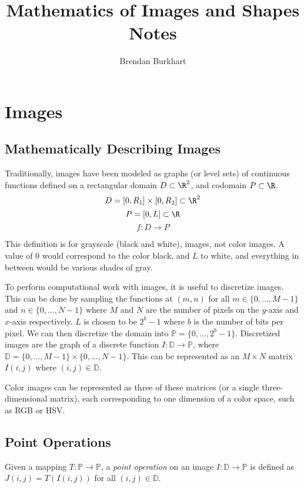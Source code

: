 \documentclass[12pt]{article}
\begin{document}
\title{Mathematics of Images and Shapes Notes}
\author{Brendan Burkhart}
\maketitle

\tableofcontents
\newpage

\section{Images}

\subsection{Mathematically Describing Images}

Traditionally, images have been modeled as graphs (or level sets) of continuous functions defined on a rectangular domain $D \subset \R^2$, and codomain $P \subset \R$. \[D = \left[0, R_1\right] \times \left[0, R_2\right] \subset \R^2\] \[P = \left[0, L\right] \subset \R\] \[f : D \to P\]

This definition is for grayscale (black and white), images, not color images. A value of $0$ would correspond to the color black, and $L$ to white, and everything in between would be various shades of gray.

To perform computational work with images, it is useful to discretize images. This can be done by sampling the functions at $(m, n)$ for all $m \in \{0, \ldots, M-1\}$ and $n \in \{0, \ldots, N-1\}$ where $M$ and $N$ are the number of pixels on the $y$-axis and $x$-axis respectively. $L$ is chosen to be $2^b-1$ where $b$ is the number of bits per pixel. We can then discretize the domain into $\mathbb{P} = \{0, \ldots, 2^b-1\}$. Discretized images are the graph of a discrete function $I: \mathbb{D} \to \mathbb{P}$, where $\mathbb{D} = \{0, \ldots, M-1\} \times \{0, \ldots, N-1\}$. This can be represented as an $M \times N$ matrix $I(i, j)$ where $(i, j) \in \mathbb{D}$.

Color images can be represented as three of these matrices (or a single three-dimensional matrix), each corresponding to one dimension of a color space, such as RGB or HSV.

\subsection{Point Operations}

\begin{defn}
    Given a mapping $T: \mathbb{P} \to \mathbb{P}$, a \emph{point operation} on an image $I: \mathbb{D} \to \mathbb{P}$ is defined as $J(i, j) = T(I(i, j))$ for all $(i, j) \in \mathbb{D}$.
\end{defn}
\end{document}
